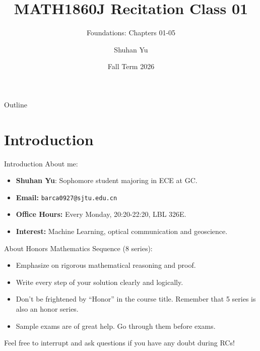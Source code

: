 \documentclass[dvipsnames]{beamer}
\title{MATH1860J Recitation Class 01}
\subtitle{Foundations: Chapters 01-05}
\author{Shuhan Yu}
\institute{SJTU Global College}
\date{Fall Term 2026}
\theoremstyle{plain}
\theoremstyle{definition}
\begin{document}

\begin{frame}
    \titlepage
\end{frame}

\begin{frame}{Outline}
    \tableofcontents
\end{frame}

\section{Introduction}
\begin{frame}{Introduction}
About me:
\begin{itemize}
    \item \textbf{Shuhan Yu}: Sophomore student majoring in ECE at GC.
    \item \textbf{Email:} \texttt{barca0927@sjtu.edu.cn}
    \item \textbf{Office Hours:} Every Monday, 20:20-22:20, LBL 326E.
    \item \textbf{Interest:} Machine Learning, optical communication and geoscience.
\end{itemize}
\vspace{0.5em}
About Honors Mathematics Sequence (8 series):
\begin{itemize}
    \item Emphasize on rigorous mathematical reasoning and proof.
    \item Write every step of your solution clearly and logically.
    \item Don't be frightened by ``Honor'' in the course title. Remember that 5 series is also an honor series.
    \item Sample exams are of great help. Go through them before exams.
\end{itemize}
Feel free to interrupt and ask questions if you have any doubt during RCs!
\end{frame}
\end{document}
